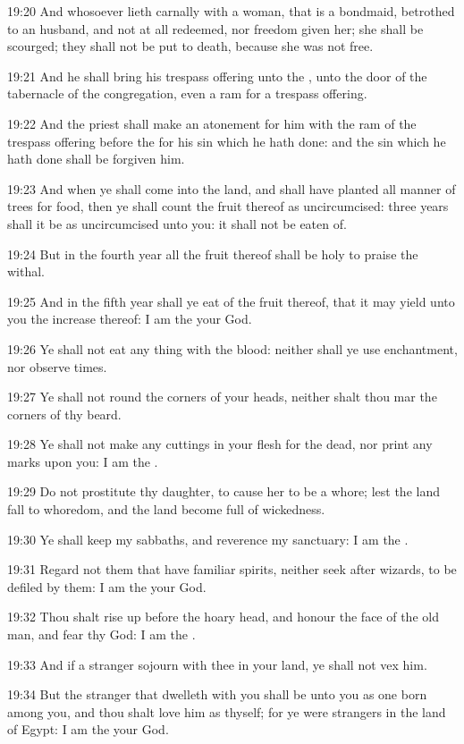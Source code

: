 19:20 And whosoever lieth carnally with a woman, that is a bondmaid, betrothed to an husband, and not at all redeemed, nor freedom given her; she shall be scourged; they shall not be put to death, because she was not free.

19:21 And he shall bring his trespass offering unto the \LORD, unto the door of the tabernacle of the congregation, even a ram for a trespass offering.

19:22 And the priest shall make an atonement for him with the ram of the trespass offering before the \LORD for his sin which he hath done: and the sin which he hath done shall be forgiven him.

19:23 And when ye shall come into the land, and shall have planted all manner of trees for food, then ye shall count the fruit thereof as uncircumcised: three years shall it be as uncircumcised unto you: it shall not be eaten of.

19:24 But in the fourth year all the fruit thereof shall be holy to praise the \LORD withal.

19:25 And in the fifth year shall ye eat of the fruit thereof, that it may yield unto you the increase thereof: I am the \LORD your God.

19:26 Ye shall not eat any thing with the blood: neither shall ye use enchantment, nor observe times.

19:27 Ye shall not round the corners of your heads, neither shalt thou mar the corners of thy beard.

19:28 Ye shall not make any cuttings in your flesh for the dead, nor print any marks upon you: I am the \LORD.

19:29 Do not prostitute thy daughter, to cause her to be a whore; lest the land fall to whoredom, and the land become full of wickedness.

19:30 Ye shall keep my sabbaths, and reverence my sanctuary: I am the \LORD.

19:31 Regard not them that have familiar spirits, neither seek after wizards, to be defiled by them: I am the \LORD your God.

19:32 Thou shalt rise up before the hoary head, and honour the face of the old man, and fear thy God: I am the \LORD.

19:33 And if a stranger sojourn with thee in your land, ye shall not vex him.

19:34 But the stranger that dwelleth with you shall be unto you as one born among you, and thou shalt love him as thyself; for ye were strangers in the land of Egypt: I am the \LORD your God.

